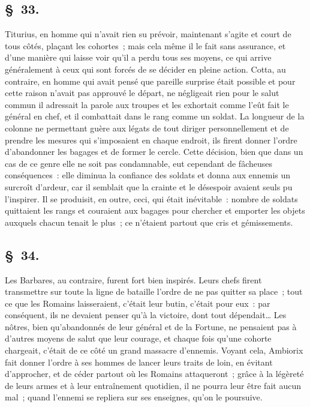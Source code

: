 \documentclass[french,twoside]{book} %
\begin{document}
\subsection[{§ 33.}]{ \textsc{§ 33.} }
\noindent Titurius, en homme qui n’avait rien su prévoir, maintenant s’agite et court de tous côtés, plaçant les cohortes ; mais cela même il le fait sans assurance, et d’une manière qui laisse voir qu’il a perdu tous ses moyens, ce qui arrive généralement à ceux qui sont forcés de se décider en pleine action. Cotta, au contraire, en homme qui avait pensé que pareille surprise était possible et pour cette raison n’avait pas approuvé le départ, ne négligeait rien pour le salut commun il adressait la parole aux troupes et les exhortait comme l’eût fait le général en chef, et il combattait dans le rang comme un soldat. La longueur de la colonne ne permettant guère aux légats de tout diriger personnellement et de prendre les mesures qui s’imposaient en chaque endroit, ils firent donner l’ordre d’abandonner les bagages et de former le cercle. Cette décision, bien que dans un cas de ce genre elle ne soit pas condamnable, eut cependant de fâcheuses conséquences : elle diminua la confiance des soldats et donna aux ennemis un surcroît d’ardeur, car il semblait que la crainte et le désespoir avaient seuls pu l’inspirer. Il se produisit, en outre, ceci, qui était inévitable : nombre de soldats quittaient les rangs et couraient aux bagages pour chercher et emporter les objets auxquels chacun tenait le plus ; ce n’étaient partout que cris et gémissements.
\subsection[{§ 34.}]{ \textsc{§ 34.} }
\noindent Les Barbares, au contraire, furent fort bien inspirés. Leurs chefs firent transmettre sur toute la ligne de bataille l’ordre de ne pas quitter sa place ; tout ce que les Romains laisseraient, c’était leur butin, c’était pour eux : par conséquent, ils ne devaient penser qu’à la victoire, dont tout dépendait… Les nôtres, bien qu’abandonnés de leur général et de la Fortune, ne pensaient pas à d’autres moyens de salut que leur courage, et chaque fois qu’une cohorte chargeait, c’était de ce côté un grand massacre d’ennemis. Voyant cela, Ambiorix fait donner l’ordre à ses hommes de lancer leurs traits de loin, en évitant d’approcher, et de céder partout où les Romains attaqueront ; grâce à la légèreté de leurs armes et à leur entraînement quotidien, il ne pourra leur être fait aucun mal ; quand l’ennemi se repliera sur ses enseignes, qu’on le poursuive.
\end{document}
